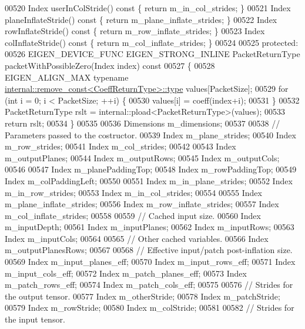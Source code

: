 \begin{DoxyCode}
00520   Index userInColStride()\textcolor{keyword}{ const }\{ \textcolor{keywordflow}{return} m\_in\_col\_strides; \}
00521   Index planeInflateStride()\textcolor{keyword}{ const }\{ \textcolor{keywordflow}{return} m\_plane\_inflate\_strides; \}
00522   Index rowInflateStride()\textcolor{keyword}{ const }\{ \textcolor{keywordflow}{return} m\_row\_inflate\_strides; \}
00523   Index colInflateStride()\textcolor{keyword}{ const }\{ \textcolor{keywordflow}{return} m\_col\_inflate\_strides; \}
00524 
00525  \textcolor{keyword}{protected}:
00526   EIGEN\_DEVICE\_FUNC EIGEN\_STRONG\_INLINE PacketReturnType packetWithPossibleZero(Index index)\textcolor{keyword}{ const}
00527 \textcolor{keyword}{  }\{
00528     EIGEN\_ALIGN\_MAX \textcolor{keyword}{typename} \hyperlink{group___sparse_core___module}{internal::remove\_const<CoeffReturnType>::type}
       values[PacketSize];
00529     \textcolor{keywordflow}{for} (\textcolor{keywordtype}{int} i = 0; i < PacketSize; ++i) \{
00530       values[i] = coeff(index+i);
00531     \}
00532     PacketReturnType rslt = internal::pload<PacketReturnType>(values);
00533     \textcolor{keywordflow}{return} rslt;
00534   \}
00535 
00536   Dimensions m\_dimensions;
00537 
00538   \textcolor{comment}{// Parameters passed to the costructor.}
00539   Index m\_plane\_strides;
00540   Index m\_row\_strides;
00541   Index m\_col\_strides;
00542 
00543   Index m\_outputPlanes;
00544   Index m\_outputRows;
00545   Index m\_outputCols;
00546 
00547   Index m\_planePaddingTop;
00548   Index m\_rowPaddingTop;
00549   Index m\_colPaddingLeft;
00550 
00551   Index m\_in\_plane\_strides;
00552   Index m\_in\_row\_strides;
00553   Index m\_in\_col\_strides;
00554 
00555   Index m\_plane\_inflate\_strides;
00556   Index m\_row\_inflate\_strides;
00557   Index m\_col\_inflate\_strides;
00558 
00559   \textcolor{comment}{// Cached input size.}
00560   Index m\_inputDepth;
00561   Index m\_inputPlanes;
00562   Index m\_inputRows;
00563   Index m\_inputCols;
00564 
00565   \textcolor{comment}{// Other cached variables.}
00566   Index m\_outputPlanesRows;
00567 
00568   \textcolor{comment}{// Effective input/patch post-inflation size.}
00569   Index m\_input\_planes\_eff;
00570   Index m\_input\_rows\_eff;
00571   Index m\_input\_cols\_eff;
00572   Index m\_patch\_planes\_eff;
00573   Index m\_patch\_rows\_eff;
00574   Index m\_patch\_cols\_eff;
00575 
00576   \textcolor{comment}{// Strides for the output tensor.}
00577   Index m\_otherStride;
00578   Index m\_patchStride;
00579   Index m\_rowStride;
00580   Index m\_colStride;
00581 
00582   \textcolor{comment}{// Strides for the input tensor.}

\end{DoxyCode}
